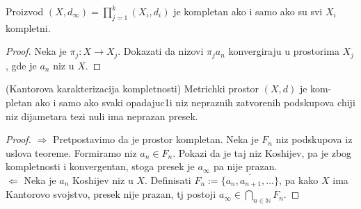 \documentclass[a4paper,12pt]{article}
\newcommand{\NN}{\mathbb{N}}
\begin{document}
\begin{tvr}
Proizvod $(X, d_{\infty}) = \prod_{j=1}^{k} (X_i, d_i)$ je kompletan ako i samo ako su svi $X_i$ kompletni.
\end{tvr}
\begin{proof}
Neka je $\pi_j : X \to X_j$. Dokazati da nizovi $\pi_j a_n$ konvergiraju u prostorima $X_j$, gde je $a_n$ niz u $X$.
\end{proof}

\begin{tma}
(Kantorova karakterizacija kompletnosti) Metrichki prostor $(X,d)$ je kom-pletan ako i samo ako svaki opadajuc1i niz nepraznih zatvorenih podskupova chiji niz dijametara tezi nuli ima neprazan presek.
\end{tma}
\begin{proof}
$\boxed{\Rightarrow}$ Pretpostavimo da je prostor kompletan. Neka je $F_n$ niz podskupova iz uslova teoreme. Formiramo niz $a_n \in F_n$. Pokazi da je taj niz Koshijev, pa je zbog kompletnosti i konvergentan, stoga presek je $a_{\infty}$ pa nije prazan. \\
$\boxed{\Leftarrow}$ Neka je $a_n$ Koshijev niz u $X$. Definisati $F_n := \overline{\{a_n ,a_{n+1}, ...\}}$, pa kako $X$ ima Kantorovo svojstvo, presek nije prazan, tj postoji $a_{\infty} \in \bigcap_{n \in \NN} F_n$.
\end{proof}
\end{document}
